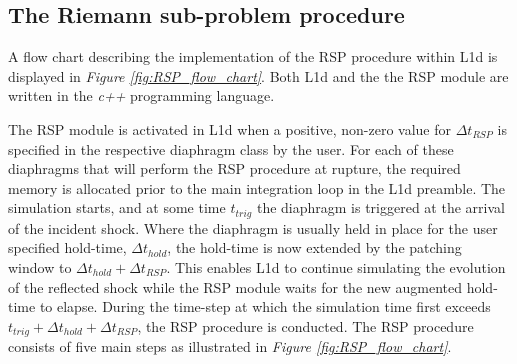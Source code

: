 \documentclass[a4paper,10pt]{article}
\begin{document}
\subsection{The Riemann sub-problem procedure}

A flow chart describing the implementation of the RSP procedure within L1d is displayed in \emph{Figure \ref{fig:RSP_flow_chart}}.  Both L1d and the the RSP module are written in the \emph{c++} programming language.

\par \medskip

The RSP module is activated in L1d when a positive, non-zero value for $\Delta t_{RSP}$ is specified in the respective diaphragm class by the user.  For each of these diaphragms that will perform the RSP procedure at rupture, the required memory is allocated prior to the main integration loop in the L1d preamble.  The simulation starts, and at some time $t_{trig}$ the diaphragm is triggered at the arrival of the incident shock.  Where the diaphragm is usually held in place for the user specified hold-time, $\Delta t_{hold}$, the hold-time is now extended by the patching window to $\Delta t_{hold} + \Delta t_{RSP}$.  This enables L1d to continue simulating the evolution of the reflected shock while the RSP module waits for the new augmented hold-time to elapse.  During the time-step at which the simulation time first exceeds $t_{trig} + \Delta t_{hold} + \Delta t_{RSP}$, the RSP procedure is conducted.  The RSP procedure consists of five main steps as illustrated in \emph{Figure \ref{fig:RSP_flow_chart}}.
\end{document}
